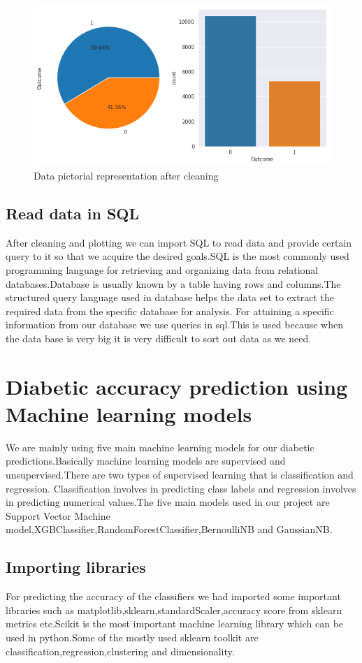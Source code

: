 \documentclass[journal,twoside,web]{ieeecolor}
\begin{document}
\begin{figure}
    \centering
    \includegraphics[scale=0.3]{cleaned data.png}
    \caption{Data pictorial representation after cleaning}
    \label{fig 4:}
\end{figure}

\subsection{Read data in SQL}
After cleaning and plotting we can import SQL to read data and  provide certain query to it so that we acquire the desired goals.SQL is the most commonly used programming language for retrieving and organizing data from  relational databases.Database is usually known by a table having rows and columns.The structured query language used in database helps the data set to extract the required data from the specific database for analysis. For attaining a specific information from our database we use queries in sql.This is used because when the data base is very big it is very difficult to sort out data as we need.

\section{Diabetic accuracy prediction using Machine learning models}
We are mainly using five main machine learning models for our diabetic predictions.Basically machine learning models are supervised and unsupervised.There are two types of supervised learning that is classification and regression. Classification involves in predicting class labels and regression involves in predicting numerical values.The five main models used in our project are Support Vector Machine model,XGBClassifier,RandomForestClassifier,BernoulliNB and GaussianNB.
\subsection{Importing libraries}
For predicting the accuracy of the classifiers we had imported some important libraries such as matplotlib,sklearn,standardScaler,accuracy score from sklearn metrics etc.Scikit is the most important machine learning library which can be used in python.Some of the mostly used sklearn toolkit are classification,regression,clustering and dimensionality.
\end{document}
